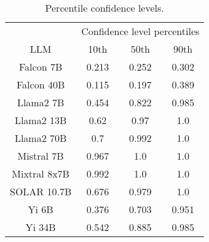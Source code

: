 \begin{table*}
\centering
\begin{tabular}{c|c|c|c}
& \multicolumn{3}{c}{Confidence level percentiles} \\ 
LLM & 10th & 50th & 90th\\ \hline
Falcon 7B & 0.213 & 0.252 & 0.302\\
Falcon 40B & 0.115 & 0.197 & 0.389\\
Llama2 7B & 0.454 & 0.822 & 0.985\\
Llama2 13B & 0.62 & 0.97 & 1.0\\
Llama2 70B & 0.7 & 0.992 & 1.0\\
Mistral 7B & 0.967 & 1.0 & 1.0\\
Mixtral 8x7B & 0.992 & 1.0 & 1.0\\
SOLAR 10.7B & 0.676 & 0.979 & 1.0\\
Yi 6B & 0.376 & 0.703 & 0.951\\
Yi 34B & 0.542 & 0.885 & 0.985\\
\hline
\end{tabular}
\caption{Percentile confidence levels.}
\label{tab:percentile_conf}
\end{table*}
